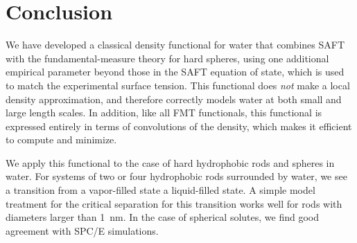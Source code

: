 \documentclass[letterpaper,twocolumn,amsmath,amssymb,prb]{revtex4-1}
\begin{document}
\section{Conclusion}

We have developed a classical density functional for water that
combines SAFT with the fundamental-measure theory for hard spheres,
using one additional empirical parameter beyond those in the SAFT
equation of state, which is used to match the experimental surface
tension.  This functional does \emph{not} make a local density
approximation, and therefore correctly models water at both small and
large length scales.  In addition, like all FMT functionals, this
functional is expressed entirely in terms of convolutions of the
density, which makes it efficient to compute and minimize.

We apply this functional to the case of hard hydrophobic rods and
spheres in water.  For systems of two or four hydrophobic rods
surrounded by water, we see a transition from a vapor-filled state a
liquid-filled state.  A simple model treatment for the critical
separation for this transition works well for rods with diameters
larger than 1~nm.  In the case of spherical solutes, we find good
agreement with SPC/E simulations.

\end{document}
